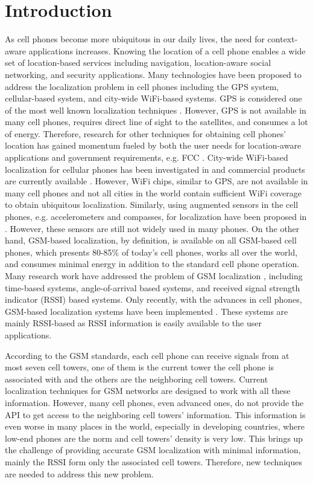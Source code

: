 \documentclass[conference]{IEEEtran}
\begin{document}
\IEEEpeerreviewmaketitle


\section{Introduction}
As cell phones become more ubiquitous in our daily lives, the need
for context-aware applications increases. Knowing the location of a
cell phone enables a wide set of location-based services including
navigation, location-aware social networking, and security
applications. Many technologies have been proposed to address the
localization problem in cell phones including the GPS system,
cellular-based system, and city-wide WiFi-based systems. GPS is
considered one of the most well known localization techniques
\cite{GPS99}. However, GPS is not available in many cell phones,
requires direct line of sight to the satellites, and consumes a lot
of energy. Therefore, research for other techniques for obtaining
cell phones' location has gained momentum fueled by both the user
needs for location-aware applications and government requirements,
e.g. FCC \cite{CELLUAR98}. City-wide WiFi-based localization for
cellular phones has been investigated in \cite{WiFi-City,PlaceLab2}
and commercial products are currently available \cite{SkyHook}.
However, WiFi chips, similar to GPS, are not available in many cell
phones and not all cities in the world contain sufficient WiFi
coverage to obtain ubiquitous localization. Similarly, using
augmented sensors in the cell phones, e.g. accelerometers and
compasses, for localization have been proposed in
\cite{CompAcc,AAMPL,Surroundsense}. However, these sensors are still
not widely used in many phones. On the other hand, GSM-based
localization, by definition, is available on all GSM-based cell
phones, which presents 80-85\% of today's cell
phones\cite{WIKIPEDIA_GSM}, works all over the world, and consumes
minimal energy in addition to the standard cell phone operation.
Many research work have addressed the problem of GSM localization
\cite{CELLUAR98,PlaceLab2,PlaceLab,GSM_INDOOR,CellSense}, including
time-based systems, angle-of-arrival based systems, and received
signal strength indicator (RSSI) based systems. Only recently, with
the advances in cell phones, GSM-based localization systems have
been implemented \cite{PlaceLab2,PlaceLab,GSM_INDOOR,CellSense}.
These systems are mainly RSSI-based as RSSI information is easily
available to the user applications.

According to the GSM standards, each cell phone can receive signals
from at most seven cell towers, one of them is the current tower the
cell phone is associated with and the others are the neighboring
cell towers. Current localization techniques for GSM networks are
designed to work with all these information. However, many cell
phones, even advanced ones, do not provide the API to get access to
the neighboring cell towers' information. This information is even
worse in many places in the world, especially in developing
countries, where low-end phones are the norm and cell towers'
density is very low. This brings up the challenge of providing
accurate GSM localization with minimal information, mainly the RSSI
form only the associated cell towers. Therefore, new techniques are
needed to address this new problem.
\end{document}
